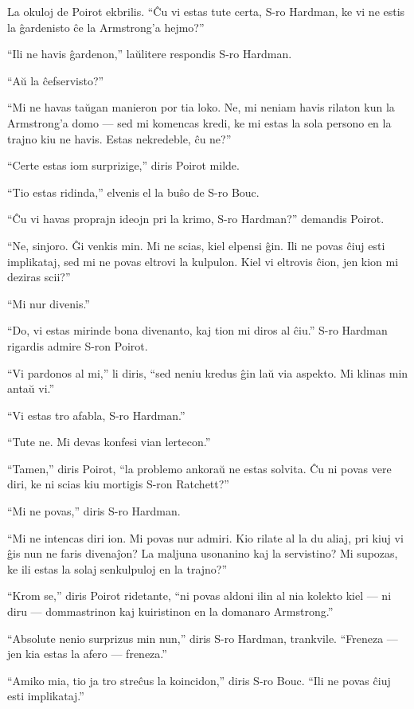 La okuloj de Poirot ekbrilis. ``Ĉu vi estas tute certa, S-ro Hardman, ke vi ne estis la ĝardenisto ĉe la Armstrong'a hejmo?''

``Ili ne havis ĝardenon,'' laŭlitere respondis S-ro Hardman.

``Aŭ la ĉefservisto?''

``Mi ne havas taŭgan manieron por tia loko. Ne, mi neniam havis rilaton kun la Armstrong'a domo --- sed mi komencas kredi, ke mi estas la sola persono en la trajno kiu ne havis. Estas nekredeble, ĉu ne?''

``Certe estas iom surprizige,'' diris Poirot milde.

``Tio estas ridinda,'' elvenis el la buŝo de S-ro Bouc.

``Ĉu vi havas proprajn ideojn pri la krimo, S-ro Hardman?'' demandis Poirot.

``Ne, sinjoro. Ĝi venkis min. Mi ne scias, kiel elpensi ĝin. Ili ne povas ĉiuj esti implikataj, sed mi ne povas eltrovi la kulpulon. Kiel vi eltrovis ĉion, jen kion mi deziras scii?''

``Mi nur divenis.''

``Do, vi estas mirinde bona divenanto, kaj tion mi diros al ĉiu.'' S-ro Hardman rigardis admire S-ron Poirot.

``Vi pardonos al mi,'' li diris, ``sed neniu kredus ĝin laŭ via aspekto. Mi klinas min antaŭ vi.''

``Vi estas tro afabla, S-ro Hardman.''

``Tute ne. Mi devas konfesi vian lertecon.''

``Tamen,'' diris Poirot, ``la problemo ankoraŭ ne estas solvita. Ĉu ni povas vere diri, ke ni scias kiu mortigis S-ron Ratchett?''

``Mi ne povas,'' diris S-ro Hardman.

``Mi ne intencas diri ion. Mi povas nur admiri. Kio rilate al la du aliaj, pri kiuj vi ĝis nun ne faris divenaĵon? La maljuna usonanino kaj la servistino? Mi supozas, ke ili estas la solaj senkulpuloj en la trajno?''

``Krom se,'' diris Poirot ridetante, ``ni povas aldoni ilin al nia kolekto kiel --- ni diru --- dommastrinon kaj kuiristinon en la domanaro Armstrong.''

``Absolute nenio surprizus min nun,'' diris S-ro Hardman, trankvile. ``Freneza --- jen kia estas la afero --- freneza.''

``Amiko mia, tio ja tro streĉus la koincidon,'' diris S-ro Bouc. ``Ili ne povas ĉiuj esti implikataj.''

